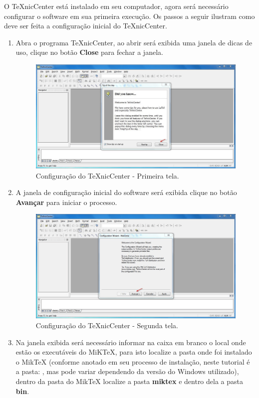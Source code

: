 O TeXnicCenter está instalado em seu computador, agora será necessário configurar o software em sua primeira execução. Os passos a seguir ilustram como deve ser feita a configuração inicial do TeXnicCenter.

\begin{enumerate}
\item Abra o programa TeXnicCenter, ao abrir será exibida uma janela de dicas de uso, clique no botão \textbf{Close} para fechar a janela.
\begin{figure}[H]
  \centering
  \includegraphics[width=1.0\textwidth]{./fig/texniccenter12}
  \caption{Configuração do TeXnicCenter - Primeira tela.}
\end{figure}
\item A janela de configuração inicial do software será exibida clique no botão \textbf{Avançar} para iniciar o processo.
\begin{figure}[H]
  \centering
  \includegraphics[width=1.0\textwidth]{./fig/texniccenter13}
  \caption{Configuração do TeXnicCenter - Segunda tela.}
\end{figure}
\item Na janela exibida será necessário informar na caixa em branco o local onde estão os executáveis do MiKTeX, para isto localize a pasta onde foi instalado o MikTeX (conforme anotado em seu processo de instalação, neste tutorial é a pasta: , mas pode variar dependendo da versão do Windows utilizado), dentro da pasta do MikTeX localize a pasta \textbf{miktex} e dentro dela a pasta \textbf{bin}.

\end{enumerate}
